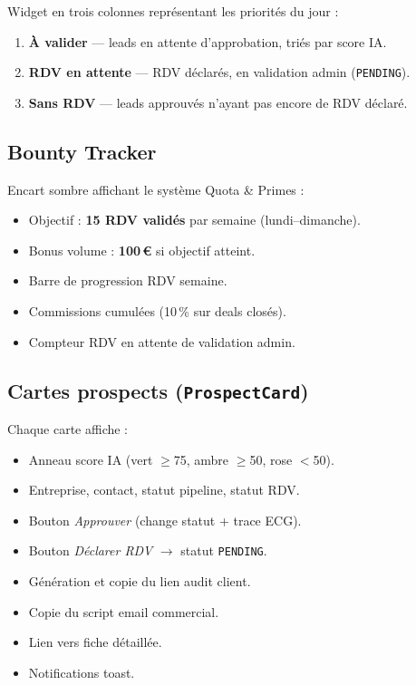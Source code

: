 \documentclass[11pt,a4paper]{report}
\begin{document}
Widget en trois colonnes représentant les priorités du jour :
\begin{enumerate}[noitemsep]
  \item \textbf{À valider} --- leads en attente d'approbation, triés par score IA.
  \item \textbf{RDV en attente} --- RDV déclarés, en validation admin (\texttt{PENDING}).
  \item \textbf{Sans RDV} --- leads approuvés n'ayant pas encore de RDV déclaré.
\end{enumerate}

\subsection{Bounty Tracker}

Encart sombre affichant le système Quota \& Primes :
\begin{itemize}[noitemsep]
  \item Objectif : \textbf{15 RDV validés} par semaine (lundi--dimanche).
  \item Bonus volume : \textbf{100\,€} si objectif atteint.
  \item Barre de progression RDV semaine.
  \item Commissions cumulées (10\,\% sur deals closés).
  \item Compteur RDV en attente de validation admin.
\end{itemize}

\subsection{Cartes prospects (\texttt{ProspectCard})}

Chaque carte affiche :
\begin{itemize}[noitemsep]
  \item Anneau score IA (vert $\geq$75, ambre $\geq$50, rose $<$50).
  \item Entreprise, contact, statut pipeline, statut RDV.
  \item Bouton \emph{Approuver} (change statut + trace ECG).
  \item Bouton \emph{Déclarer RDV} $\rightarrow$ statut \texttt{PENDING}.
  \item Génération et copie du lien audit client.
  \item Copie du script email commercial.
  \item Lien vers fiche détaillée.
  \item Notifications toast.
\end{itemize}
\end{document}
